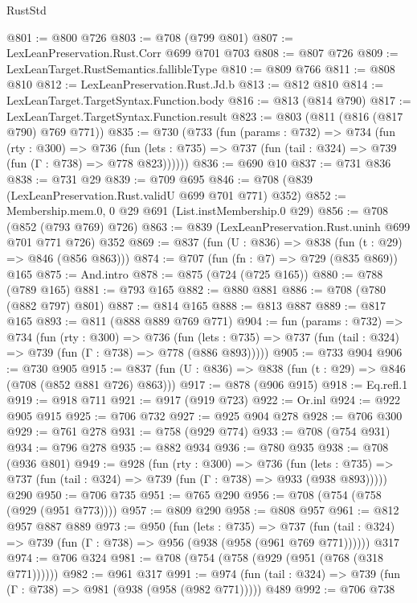 \begin{lexlean}{RustStd}
\begin{coremodule}
@801 := @800 @726
@803 := @708 (@799 @801)
@807 := LexLeanPreservation.Rust.Corr @699 @701 @703
@808 := @807 @726
@809 := LexLeanTarget.RustSemantics.fallibleType
@810 := @809 @766
@811 := @808 @810
@812 := LexLeanPreservation.Rust.Jd.b
@813 := @812 @810
@814 := LexLeanTarget.TargetSyntax.Function.body
@816 := @813 (@814 @790)
@817 := LexLeanTarget.TargetSyntax.Function.result
@823 := @803 (@811 (@816 (@817 @790) @769 @771))
@835 := @730
    (@733
      (fun (params : @732) =>
      @734
        (fun (rty : @300) =>
        @736
          (fun (lets : @735) => @737 (fun (tail : @324) => @739 (fun (Γ : @738) => @778 @823))))))
@836 := @690 @10
@837 := @731 @836
@838 := @731 @29
@839 := @709 @695
@846 := @708 (@839 (LexLeanPreservation.Rust.validU @699 @701 @771) @352)
@852 := Membership.mem.{0, 0} @29 @691 (List.instMembership.{0} @29)
@856 := @708 (@852 (@793 @769) @726)
@863 := @839 (LexLeanPreservation.Rust.uninh @699 @701 @771 @726) @352
@869 := @837 (fun (U : @836) => @838 (fun (t : @29) => @846 (@856 @863)))
@874 := @707 (fun (fn : @7) => @729 (@835 @869)) @165
@875 := And.intro
@878 := @875 (@724 (@725 @165))
@880 := @788 (@789 @165)
@881 := @793 @165
@882 := @880 @881
@886 := @708 (@780 (@882 @797) @801)
@887 := @814 @165
@888 := @813 @887
@889 := @817 @165
@893 := @811 (@888 @889 @769 @771)
@904 := fun (params : @732) =>
  @734
    (fun (rty : @300) =>
    @736
      (fun (lets : @735) => @737 (fun (tail : @324) => @739 (fun (Γ : @738) => @778 (@886 @893)))))
@905 := @733 @904
@906 := @730 @905
@915 := @837 (fun (U : @836) => @838 (fun (t : @29) => @846 (@708 (@852 @881 @726) @863)))
@917 := @878 (@906 @915)
@918 := Eq.refl.{1}
@919 := @918 @711
@921 := @917 (@919 @723)
@922 := Or.inl
@924 := @922 @905 @915
@925 := @706 @732
@927 := @925 @904 @278
@928 := @706 @300
@929 := @761 @278
@931 := @758 (@929 @774)
@933 := @708 (@754 @931)
@934 := @796 @278
@935 := @882 @934
@936 := @780 @935
@938 := @708 (@936 @801)
@949 := @928
    (fun (rty : @300) =>
    @736
      (fun (lets : @735) => @737 (fun (tail : @324) => @739 (fun (Γ : @738) => @933 (@938 @893)))))
    @290
@950 := @706 @735
@951 := @765 @290
@956 := @708 (@754 (@758 (@929 (@951 @773))))
@957 := @809 @290
@958 := @808 @957
@961 := @812 @957 @887 @889
@973 := @950
    (fun (lets : @735) =>
    @737 (fun (tail : @324) => @739 (fun (Γ : @738) => @956 (@938 (@958 (@961 @769 @771))))))
    @317
@974 := @706 @324
@981 := @708 (@754 (@758 (@929 (@951 (@768 (@318 @771))))))
@982 := @961 @317
@991 := @974 (fun (tail : @324) => @739 (fun (Γ : @738) => @981 (@938 (@958 (@982 @771))))) @489
@992 := @706 @738

\end{coremodule}
\end{lexlean}
